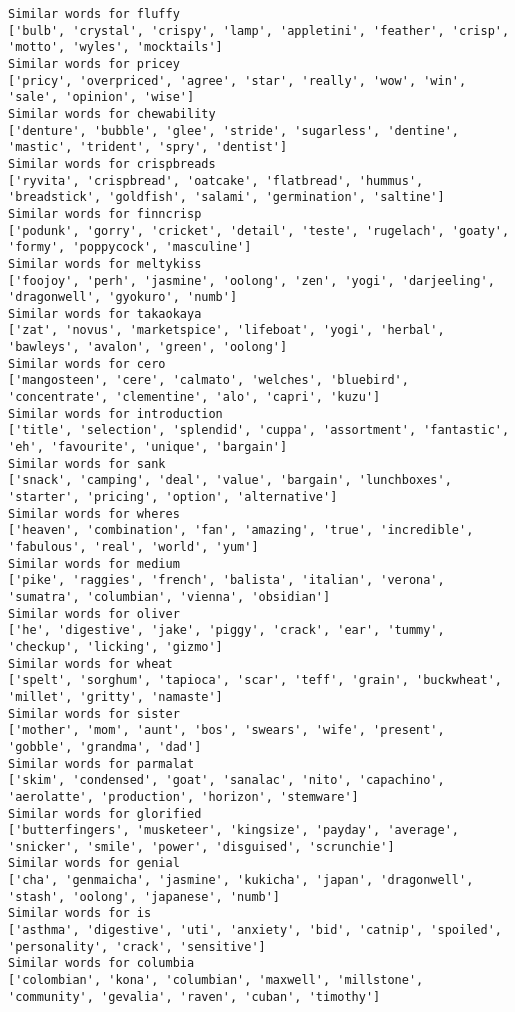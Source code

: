 \documentclass[11pt]{article}
\begin{document}
\begin{Verbatim}[commandchars=\\\{\}]
Similar words for fluffy
['bulb', 'crystal', 'crispy', 'lamp', 'appletini', 'feather', 'crisp', 'motto', 'wyles', 'mocktails']
Similar words for pricey
['pricy', 'overpriced', 'agree', 'star', 'really', 'wow', 'win', 'sale', 'opinion', 'wise']
Similar words for chewability
['denture', 'bubble', 'glee', 'stride', 'sugarless', 'dentine', 'mastic', 'trident', 'spry', 'dentist']
Similar words for crispbreads
['ryvita', 'crispbread', 'oatcake', 'flatbread', 'hummus', 'breadstick', 'goldfish', 'salami', 'germination', 'saltine']
Similar words for finncrisp
['podunk', 'gorry', 'cricket', 'detail', 'teste', 'rugelach', 'goaty', 'formy', 'poppycock', 'masculine']
Similar words for meltykiss
['foojoy', 'perh', 'jasmine', 'oolong', 'zen', 'yogi', 'darjeeling', 'dragonwell', 'gyokuro', 'numb']
Similar words for takaokaya
['zat', 'novus', 'marketspice', 'lifeboat', 'yogi', 'herbal', 'bawleys', 'avalon', 'green', 'oolong']
Similar words for cero
['mangosteen', 'cere', 'calmato', 'welches', 'bluebird', 'concentrate', 'clementine', 'alo', 'capri', 'kuzu']
Similar words for introduction
['title', 'selection', 'splendid', 'cuppa', 'assortment', 'fantastic', 'eh', 'favourite', 'unique', 'bargain']
Similar words for sank
['snack', 'camping', 'deal', 'value', 'bargain', 'lunchboxes', 'starter', 'pricing', 'option', 'alternative']
Similar words for wheres
['heaven', 'combination', 'fan', 'amazing', 'true', 'incredible', 'fabulous', 'real', 'world', 'yum']
Similar words for medium
['pike', 'raggies', 'french', 'balista', 'italian', 'verona', 'sumatra', 'columbian', 'vienna', 'obsidian']
Similar words for oliver
['he', 'digestive', 'jake', 'piggy', 'crack', 'ear', 'tummy', 'checkup', 'licking', 'gizmo']
Similar words for wheat
['spelt', 'sorghum', 'tapioca', 'scar', 'teff', 'grain', 'buckwheat', 'millet', 'gritty', 'namaste']
Similar words for sister
['mother', 'mom', 'aunt', 'bos', 'swears', 'wife', 'present', 'gobble', 'grandma', 'dad']
Similar words for parmalat
['skim', 'condensed', 'goat', 'sanalac', 'nito', 'capachino', 'aerolatte', 'production', 'horizon', 'stemware']
Similar words for glorified
['butterfingers', 'musketeer', 'kingsize', 'payday', 'average', 'snicker', 'smile', 'power', 'disguised', 'scrunchie']
Similar words for genial
['cha', 'genmaicha', 'jasmine', 'kukicha', 'japan', 'dragonwell', 'stash', 'oolong', 'japanese', 'numb']
Similar words for is
['asthma', 'digestive', 'uti', 'anxiety', 'bid', 'catnip', 'spoiled', 'personality', 'crack', 'sensitive']
Similar words for columbia
['colombian', 'kona', 'columbian', 'maxwell', 'millstone', 'community', 'gevalia', 'raven', 'cuban', 'timothy']

\end{Verbatim}
\end{document}

